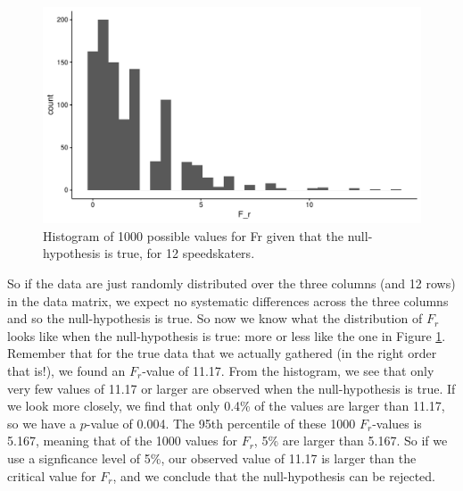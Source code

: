 \documentclass[]{book}\usepackage[]{graphicx}\usepackage[]{color}
\makeatletter
\def\maxwidth{ %
  \ifdim\Gin@nat@width>\linewidth
    \linewidth
  \else
    \Gin@nat@width
  \fi
}
\newenvironment{knitrout}{}{} %
\makeatother
\begin{document}

\begin{knitrout}
\color{fgcolor}\begin{figure}

{\centering \includegraphics[width=\maxwidth]{figure/nonparmixed_36-1} 

}

\caption[Histogram of 1000 possible values for Fr given that the null-hypothesis is true, for 12 speedskaters]{Histogram of 1000 possible values for Fr given that the null-hypothesis is true, for 12 speedskaters.}\label{fig:nonparmixed_36}
\end{figure}


\end{knitrout}

So if the data are just randomly distributed over the three columns (and 12 rows) in the data matrix, we expect no systematic differences across the three columns and so the null-hypothesis is true. So now we know what the distribution of $F_r$ looks like when the null-hypothesis is true: more or less like the one in Figure \ref{fig:nonparmixed_36}. Remember that for the true data that we actually gathered (in the right order that is!), we found an $F_r$-value of 11.17. From the histogram, we see that only very few values of 11.17 or larger are observed when the null-hypothesis is true. If we look more closely, we find that only 0.4\% of the values are larger than 11.17, so we have a $p$-value of 0.004. The 95th percentile of these 1000 $F_r$-values is 5.167, meaning that of the 1000 values for $F_r$, 5\% are larger than 5.167. So if we use a signficance level of 5\%, our observed value of 11.17 is larger than the critical value for $F_r$, and we conclude that the null-hypothesis can be rejected.
\end{document}
